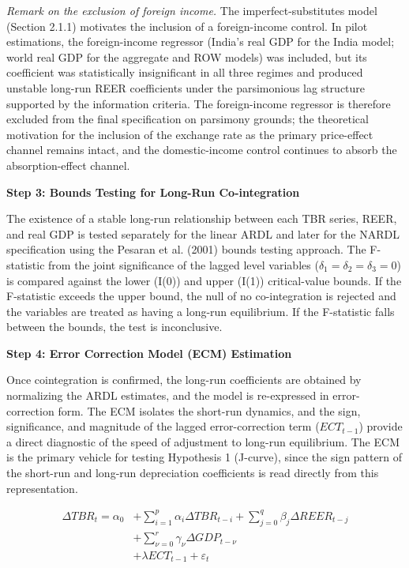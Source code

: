 \documentclass[12pt]{article}
\begin{document}
\noindent\textit{Remark on the exclusion of foreign income.} The imperfect-substitutes model (Section 2.1.1) motivates the inclusion of a foreign-income control. In pilot estimations, the foreign-income regressor (India's real GDP for the India model; world real GDP for the aggregate and ROW models) was included, but its coefficient was statistically insignificant in all three regimes and produced unstable long-run REER coefficients under the parsimonious lag structure supported by the information criteria. The foreign-income regressor is therefore excluded from the final specification on parsimony grounds; the theoretical motivation for the inclusion of the exchange rate as the primary price-effect channel remains intact, and the domestic-income control continues to absorb the absorption-effect channel.


\vspace{0.5cm}
\noindent\textbf{Step 3: Bounds Testing for Long-Run Co-integration}

The existence of a stable long-run relationship between each TBR series, REER, and real GDP is tested separately for the linear ARDL and later for the NARDL specification using the Pesaran et al. (2001) bounds testing approach. The F-statistic from the joint significance of the lagged level variables ($\delta_1 = \delta_2 = \delta_3 = 0$) is compared against the lower (I(0)) and upper (I(1)) critical-value bounds. If the F-statistic exceeds the upper bound, the null of no co-integration is rejected and the variables are treated as having a long-run equilibrium. If the F-statistic falls between the bounds, the test is inconclusive.

\vspace{0.5cm}
\noindent\textbf{Step 4: Error Correction Model (ECM) Estimation}

Once cointegration is confirmed, the long-run coefficients are obtained by normalizing the ARDL estimates, and the model is re-expressed in error-correction form. The ECM isolates the short-run dynamics, and the sign, significance, and magnitude of the lagged error-correction term ($ECT_{t-1}$) provide a direct diagnostic of the speed of adjustment to long-run equilibrium. The ECM is the primary vehicle for testing Hypothesis 1 (J-curve), since the sign pattern of the short-run and long-run depreciation coefficients is read directly from this representation.

\[
\begin{aligned}
\Delta TBR_t = \alpha_0 &+ \sum_{i=1}^{p} \alpha_i \Delta TBR_{t-i} + \sum_{j=0}^{q} \beta_j \Delta REER_{t-j} \\
&+ \sum_{\nu=0}^{r} \gamma_\nu \Delta GDP_{t-\nu} \\
&+ \lambda ECT_{t-1} + \varepsilon_t
\end{aligned}
\tag{2}
\]
\end{document}
